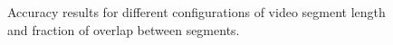 

\begin{figure}[ht!]
\centering
{}
\caption{\label{fig:ActionRecogntion} Accuracy results for different configurations of video segment length and fraction of overlap between segments.}
\end{figure}
